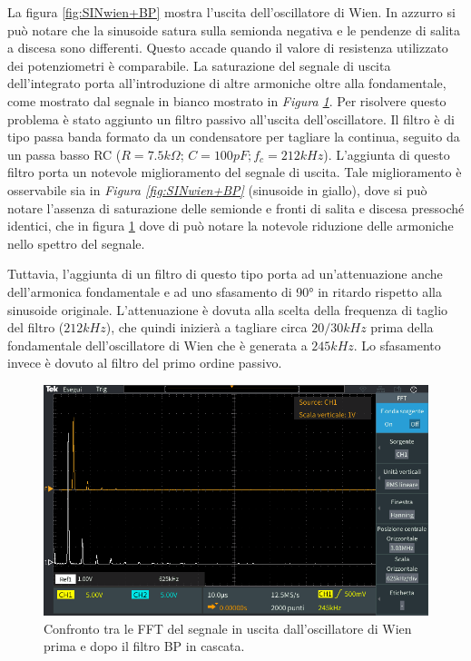 \documentclass[titlepage]{report}
\begin{document}
	La figura \ref{fig:SINwien+BP} mostra l'uscita dell'oscillatore di Wien. In azzurro si può notare che la sinusoide satura sulla semionda negativa e le pendenze di salita a discesa sono differenti. Questo accade quando il valore di resistenza utilizzato dei potenziometri è comparabile. La saturazione del segnale di uscita dell'integrato porta all'introduzione di altre armoniche oltre alla fondamentale, come mostrato dal segnale in bianco mostrato in \textit{Figura \ref{fig:FFTwien+BP}}.
	Per risolvere questo problema è stato aggiunto un filtro passivo all'uscita dell'oscillatore. Il filtro è di tipo passa banda formato da un condensatore per tagliare la continua, seguito da un passa basso RC ($R = 7.5k\Omega$; $C = 100pF; f_c = 212kHz$).
	L'aggiunta di questo filtro porta un notevole miglioramento del segnale di uscita. Tale miglioramento è osservabile sia in \textit{Figura \ref{fig:SINwien+BP}} (sinusoide in giallo), dove si può notare l'assenza di saturazione delle semionde e fronti di salita e discesa pressoché identici, che in figura \ref{fig:FFTwien+BP} dove di può notare la notevole riduzione delle armoniche nello spettro del segnale.

	Tuttavia, l'aggiunta di un filtro di questo tipo porta ad un'attenuazione anche dell'armonica fondamentale e ad uno sfasamento di 90° in ritardo rispetto alla sinusoide originale. L'attenuazione è dovuta alla scelta della frequenza di taglio del filtro ($212kHz$), che quindi inizierà a tagliare circa $20/30kHz$ prima della fondamentale dell'oscillatore di Wien che è generata a $245kHz$. Lo sfasamento invece è dovuto al filtro del primo ordine passivo.

	\begin{figure}[H]
		\centering
		\includegraphics[scale=0.5]{Immagini/fft_osc+bp210k.PNG}
		\caption{Confronto tra le FFT del segnale in uscita dall'oscillatore di Wien prima e dopo il filtro BP in cascata.}
		\label{fig:FFTwien+BP}
	\end{figure}
\end{document}
